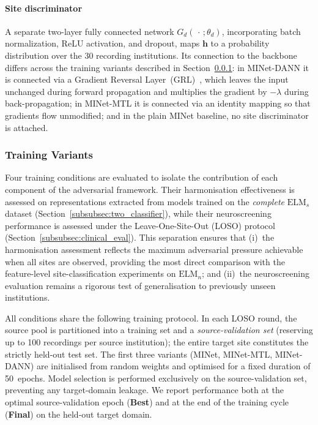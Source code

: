 \documentclass[preprint,12pt]{elsarticle}
\begin{document}
\paragraph{Site discriminator}
A separate two-layer fully connected network $G_d(\,\cdot\,;\theta_d)$, incorporating batch normalization, ReLU activation, and dropout, maps $\mathbf{h}$ to a probability distribution over the 30 recording institutions. Its connection to the backbone differs across the training variants described in Section~\ref{sec:training_variants}: in \mbox{MINet-DANN} it is connected via a Gradient Reversal Layer~(GRL)~\cite{ganin2016domain}, which leaves the input unchanged during forward propagation and multiplies the gradient by $-\lambda$ during back-propagation; in \mbox{MINet-MTL} it is connected via an identity mapping so that gradients flow unmodified; and in the plain MINet baseline, no site discriminator is attached.

\subsubsection{Training Variants}
\label{sec:training_variants}

Four training conditions are evaluated to isolate the contribution
of each component of the adversarial framework.
Their harmonisation effectiveness is assessed on representations
extracted from models trained on the \emph{complete}
$\mathrm{ELM}_s$ dataset
(Section~\ref{subsubsec:two_classifier}), while their
neuroscreening performance is assessed under the
Leave-One-Site-Out (LOSO) protocol
(Section~\ref{subsubsec:clinical_eval}).
This separation ensures that (i)~the harmonisation assessment
reflects the maximum adversarial pressure achievable when all
sites are observed, providing the most direct comparison with the
feature-level site-classification experiments on
$\mathrm{ELM}_n$; and (ii)~the neuroscreening evaluation remains
a rigorous test of generalisation to previously unseen
institutions.

All conditions share the following training protocol.
In each LOSO round, the source pool is partitioned into a training
set and a \emph{source-validation set} (reserving up to 100
recordings per source institution); the entire target site
constitutes the strictly held-out test set.
The first three variants (MINet, MINet-MTL, MINet-DANN) are
initialised from random weights and optimised for a fixed duration
of 50~epochs.
Model selection is performed exclusively on the source-validation
set, preventing any target-domain leakage.
We report performance both at the optimal source-validation epoch
(\textbf{Best}) and at the end of the training cycle
(\textbf{Final}) on the held-out target domain.
\end{document}
